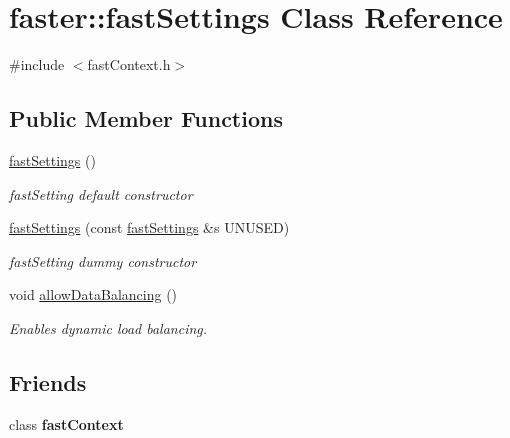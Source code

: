 \hypertarget{classfaster_1_1fastSettings}{}\section{faster\+:\+:fast\+Settings Class Reference}
\label{classfaster_1_1fastSettings}


{\ttfamily \#include $<$fast\+Context.\+h$>$}

\subsection*{Public Member Functions}
\begin{DoxyCompactItemize}
\item 
\hypertarget{classfaster_1_1fastSettings_a29deb352bf81074dac468dfe5af20cc5}{}\hyperlink{classfaster_1_1fastSettings_a29deb352bf81074dac468dfe5af20cc5}{fast\+Settings} ()\label{classfaster_1_1fastSettings_a29deb352bf81074dac468dfe5af20cc5}

\begin{DoxyCompactList}\small\item\em fast\+Setting default constructor \end{DoxyCompactList}\item 
\hypertarget{classfaster_1_1fastSettings_ae63a2b5a6accbf3600bc9ac659269532}{}\hyperlink{classfaster_1_1fastSettings_ae63a2b5a6accbf3600bc9ac659269532}{fast\+Settings} (const \hyperlink{classfaster_1_1fastSettings}{fast\+Settings} \&s U\+N\+U\+S\+E\+D)\label{classfaster_1_1fastSettings_ae63a2b5a6accbf3600bc9ac659269532}

\begin{DoxyCompactList}\small\item\em fast\+Setting dummy constructor \end{DoxyCompactList}\item 
\hypertarget{classfaster_1_1fastSettings_a33acd4169431c784d12bf960cacda6ed}{}void \hyperlink{classfaster_1_1fastSettings_a33acd4169431c784d12bf960cacda6ed}{allow\+Data\+Balancing} ()\label{classfaster_1_1fastSettings_a33acd4169431c784d12bf960cacda6ed}

\begin{DoxyCompactList}\small\item\em Enables dynamic load balancing. \end{DoxyCompactList}\end{DoxyCompactItemize}
\subsection*{Friends}
\begin{DoxyCompactItemize}
\item 
\hypertarget{classfaster_1_1fastSettings_a8ffe9636e25b4912700710d5fd2b5a2a}{}class {\bfseries fast\+Context}\label{classfaster_1_1fastSettings_a8ffe9636e25b4912700710d5fd2b5a2a}

\end{DoxyCompactItemize}


